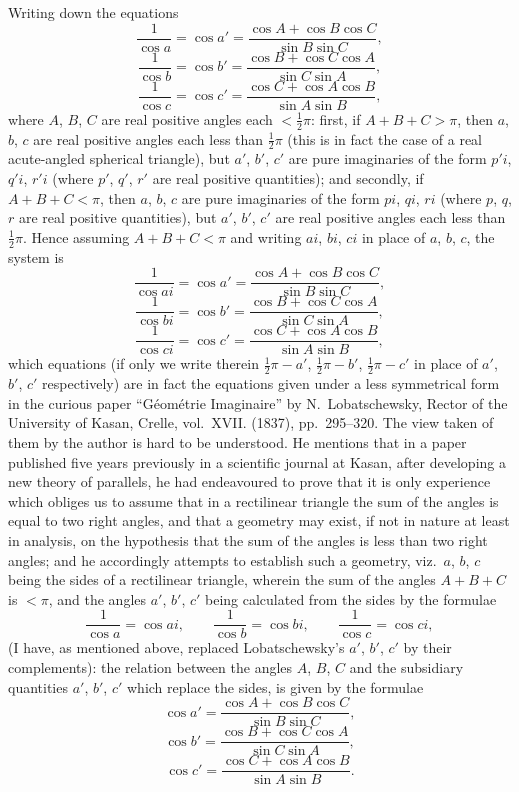 \documentclass[11pt,a4paper]{article}
\theoremstyle{plain}
\begin{document}
Writing down the equations
\[
\frac{1}{\cos a} = \cos a' = \frac{\cos A + \cos B \cos C}{\sin B \sin C},
\]
\[
\frac{1}{\cos b} = \cos b' = \frac{\cos B + \cos C \cos A}{\sin C \sin A},
\]
\[
\frac{1}{\cos c} = \cos c' = \frac{\cos C + \cos A \cos B}{\sin A \sin B},
\]
where $A$, $B$, $C$ are real positive angles each $< \frac12\pi$: first, if $A + B + C > \pi$, then $a$, $b$, $c$ are real positive angles each less than $\frac12\pi$ (this is in fact the case of a real acute-angled spherical triangle), but $a'$, $b'$, $c'$ are pure imaginaries of the form $p'i$, $q'i$, $r'i$ (where $p'$, $q'$, $r'$ are real positive quantities); and secondly, if $A + B + C < \pi$, then $a$, $b$, $c$ are pure imaginaries of the form $pi$, $qi$, $ri$ (where $p$, $q$, $r$ are real positive quantities), but $a'$, $b'$, $c'$ are real positive angles each less than $\frac12\pi$. Hence assuming $A + B + C < \pi$ and writing $ai$, $bi$, $ci$ in place of $a$, $b$, $c$, the system is
\[
\frac{1}{\cos ai} = \cos a' = \frac{\cos A + \cos B \cos C}{\sin B \sin C},
\]
\[
\frac{1}{\cos bi} = \cos b' = \frac{\cos B + \cos C \cos A}{\sin C \sin A},
\]
\[
\frac{1}{\cos ci} = \cos c' = \frac{\cos C + \cos A \cos B}{\sin A \sin B},
\]
which equations (if only we write therein $\frac12\pi - a'$, $\frac12\pi - b'$, $\frac12\pi - c'$ in place of $a'$, $b'$, $c'$ respectively) are in fact the equations given under a less symmetrical form in the curious paper ``G\'{e}om\'{e}trie Imaginaire'' by N.~Lobatschewsky, Rector of the University of Kasan, Crelle, vol.~XVII. (1837), pp.~295--320. The view taken of them by the author is hard to be understood. He mentions that in a paper published five years previously in a scientific journal at Kasan, after developing a new theory of parallels, he had endeavoured to prove that it is only experience which obliges us to assume that in a rectilinear triangle the sum of the angles is equal to two right angles, and that a geometry may exist, if not in nature at least in analysis, on the hypothesis that the sum of the angles is less than two right angles; and he accordingly attempts to establish such a geometry, viz.\ $a$, $b$, $c$ being the sides of a rectilinear triangle, wherein the sum of the angles $A + B + C$ is $< \pi$, and the angles $a'$, $b'$, $c'$ being calculated from the sides by the formulae
\[
\frac{1}{\cos a} = \cos ai, \qquad
\frac{1}{\cos b} = \cos bi, \qquad
\frac{1}{\cos c} = \cos ci,
\]
(I have, as mentioned above, replaced Lobatschewsky's $a'$, $b'$, $c'$ by their complements): the relation between the angles $A$, $B$, $C$ and the subsidiary quantities $a'$, $b'$, $c'$ which replace the sides, is given by the formulae
\[
\cos a' = \frac{\cos A + \cos B \cos C}{\sin B \sin C},
\]
\[
\cos b' = \frac{\cos B + \cos C \cos A}{\sin C \sin A},
\]
\[
\cos c' = \frac{\cos C + \cos A \cos B}{\sin A \sin B}.
\]
\end{document}
